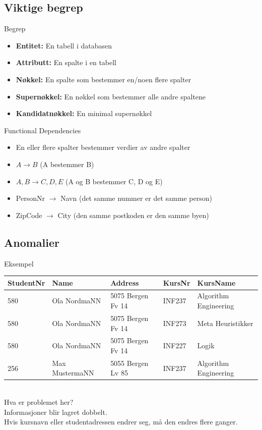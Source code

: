 \subsection*{Viktige begrep}
\begin{frame}{Begrep}
\begin{itemize}
    \item \textbf{Entitet: }En tabell i databasen
    \item \textbf{Attributt: }En spalte i en tabell
    \item \textbf{Nøkkel: }En spalte som bestemmer en/noen flere spalter
    \item \textbf{Supernøkkel: }En nøkkel som bestemmer alle andre spaltene
    \item \textbf{Kandidatnøkkel: }En minimal supernøkkel
\end{itemize}
\end{frame}

\begin{frame}{Functional Dependencies}
\begin{itemize}
    \item En eller flere spalter bestemmer verdier av andre spalter
    \item $A \rightarrow B$ (A bestemmer B)
    \item $A,B \rightarrow C, D, E$ (A og B bestemmer C, D og E)
    \item PersonNr $\rightarrow$ Navn (det samme nummer er det samme person)
    \item ZipCode $\rightarrow$ City (den samme postkoden er den samme byen)
\end{itemize}
\end{frame}

\subsection*{Anomalier}
\begin{frame}{Eksempel}
\begin{tabular}{l|l|l|l|l}
 StudentNr & Name & Address & KursNr & KursName \\\hline
 580 & Ola NordmaNN & 5075 Bergen Fv 14 & INF237 & Algorithm Engineering\\
 580 & Ola NordmaNN & 5075 Bergen Fv 14 & INF273 & Meta Heuristikker\\
 580 & Ola NordmaNN & 5075 Bergen Fv 14 & INF227 & Logik\\
 256 & Max MustermaNN & 5055 Bergen Lv 85 & INF237 & Algorithm Engineering\\
\end{tabular}
\\[5mm]
Hva er problemet her?\\
Informasjoner blir lagret dobbelt.\\
Hvis kursnavn eller studentadressen endrer seg, må den endres flere ganger.
\end{frame}

